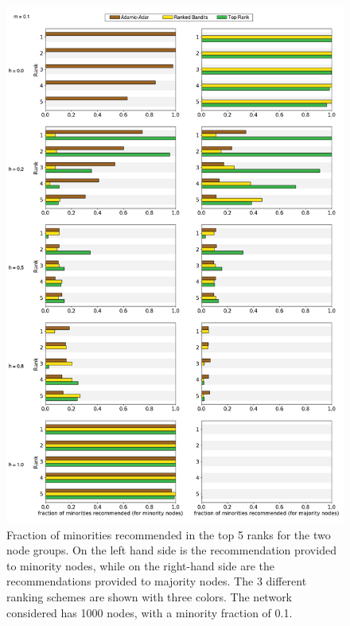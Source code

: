 \begin{figure}
	\includegraphics[scale=0.28]{images/proposal_figure_3_2}
	\caption{Fraction of minorities recommended in the top 5 ranks for the two node groups. On the left hand side is the recommendation provided to minority nodes, while on the right-hand side are the recommendations provided to majority nodes. The 3 different ranking schemes are shown with three colors. The network considered has 1000 nodes, with a minority fraction of 0.1.}
	\label{fig-rank_2}
\end{figure}
